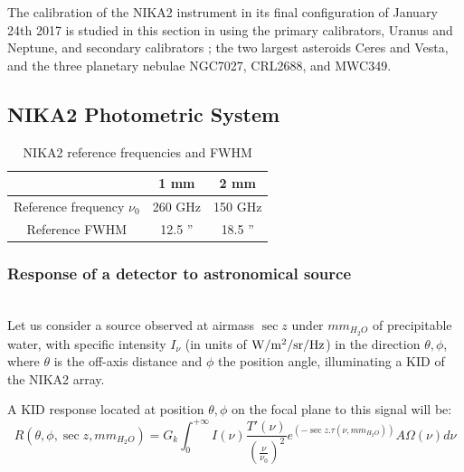 %


The calibration of the NIKA2 instrument in its final configuration
of January 24th 2017  is studied in this section  in using the 
 primary calibrators, Uranus and Neptune, and secondary calibrators ; the two largest asteroids Ceres and Vesta, and the three
planetary nebulae NGC7027, CRL2688, and MWC349.


\subsection{NIKA2 Photometric System}
\label{se:cal_HA}

\begin{table}[h]
\begin{center}
\begin{tabular}{|c|c|c|}
\hline
     & 1 mm & 2 mm \\
\hline
Reference frequency $\nu_{0}$ & 260 GHz & 150 GHz \\
\hline
Reference FWHM                      & 12.5  '' & 18.5 '' \\
\hline
\end{tabular}
\caption{NIKA2 reference frequencies and FWHM}
\end{center}
\label{tab:definitions}
\end{table}

\subsubsection{Response of a detector to astronomical source}

\\

Let us consider a source observed at airmass $\sec z$ under
$mm_{H_{2}O}$ of precipitable water, with specific intensity $I_{\nu}$ (in units
of  ${\rm W/m^{2}/sr/Hz}$) in the direction $\theta, \phi$, where $\theta$
is the off-axis distance and $\phi$ the position angle, illuminating a KID
of the NIKA2 array. 

A KID response located at position $\theta, \phi$
on the focal plane to this signal will be:
\begin{equation}
R(\theta, \phi, \sec z, mm_{H_{2}O}) = G_{k} \int_{0}^{+\infty} I(\nu)
\frac{T'(\nu)}{\left(\frac{\nu}{\nu_{0}}\right)^{2}} e^{\left(-\sec z
  . \tau(\nu,  mm_{H_{2}O})\right)}A\Omega (\nu)  d\nu 
\label{eq:basicphot}
\end{equation}

